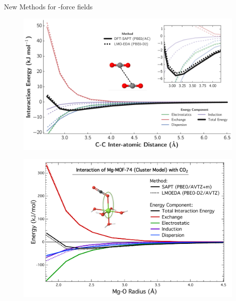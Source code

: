 \begin{section}{New Methods for \cus-\mof force fields}
    \begin{figure}
    \centering
    \includegraphics[width=1.0\textwidth]{lmoeda/co2_co2_pes.pdf}
    \caption[\pes for \co ]
{
            }
    \label{fig:lmoeda-co2_co2}
    \end{figure}

    \begin{figure}
    \centering
    \includegraphics[width=1.0\textwidth]{lmoeda/co2_mgmof_pes.pdf}
    \caption[\pes for \co and \mgmof]
{
            }
    \label{fig:lmoeda-co2_mgmof}
    \end{figure}


\end{section}

